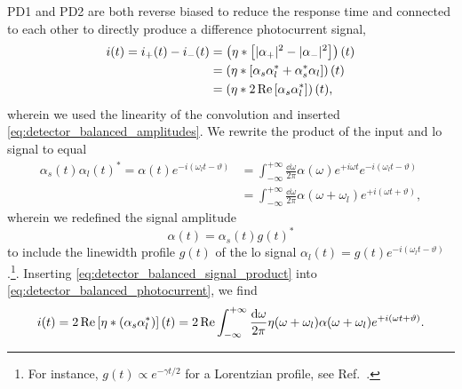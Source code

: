 PD1 and PD2 are both reverse biased to reduce the response time and connected to each other to directly produce a difference photocurrent signal,
\begin{equation}
	\begin{split}
		i(t)
		=
		i_+(t)
		-
		i_-(t)
		&=
		\left(
			\eta
			\ast
			\left[
				\lvert\alpha_+\rvert^2
				-
				\lvert\alpha_-\rvert^2
			\right]		
		\right)(t)
		\\
		&=
		\left(
			\eta
			\ast
			\left[
				\alpha_s
				\alpha_l^*
				+
				\alpha_s^*
				\alpha_l
			\right]
		\right)(t)
		\\
		&=
		\left(
			\eta
			\ast
			2\operatorname{Re}\left[
				\alpha_s
				\alpha_l^*
			\right]
		\right)(t)
		,
	\end{split}
	\label{eq:detector_balanced_photocurrent}
\end{equation}
wherein we used the linearity of the convolution and inserted \cref{eq:detector_balanced_amplitudes}.
We rewrite the product of the input and \gls{lo} signal to equal
\begin{equation}
	\begin{split}
		\alpha_s(t)
		\alpha_l(t)^*
		=
		\alpha(t)
		e^{-i(\omega_lt-\vartheta)}
		&=
		\int_{-\infty}^{+\infty}
		\frac{\dd{\omega}}{2\pi}
		\alpha(\omega)
		e^{+i\omega t}
		e^{-i(\omega_l t-\vartheta)}
		\\
		&=
		\int_{-\infty}^{+\infty}
		\frac{\dd{\omega}}{2\pi}
		\alpha(\omega+\omega_l)
		e^{+i(\omega t+\vartheta)}
		,
	\end{split}
	\label{eq:detector_balanced_signal_product}
\end{equation}
wherein we redefined the signal amplitude
\begin{equation}
	\alpha(t)
	=
	\alpha_s(t)
	g(t)^*
\end{equation}
to include the linewidth profile $g(t)$ of the \gls{lo} signal $\alpha_l(t)=g(t)e^{-i(\omega_lt-\vartheta)}$.\footnote{For instance, $g(t)\propto e^{-\gamma t/2}$ for a Lorentzian profile, see Ref.~\cite{Demtroeder2014}.}.
Inserting \cref{eq:detector_balanced_signal_product} into \cref{eq:detector_balanced_photocurrent}, we find
\begin{equation}
	\begin{split}
		i(t)
		=
		2\Re\left[
			\eta
			\conv
			(\alpha_s\alpha_l^*)
		\right](t)
		=
		2\Re
		\int_{-\infty}^{+\infty}
		\frac{\dd{\omega}}{2\pi}
		\eta(\omega+\omega_l)
		\alpha(\omega+\omega_l)
		e^{+i(\omega t+\vartheta)}
		.
	\end{split}
	\label{eq:detector_balanced_photocurrent_final}
\end{equation}
